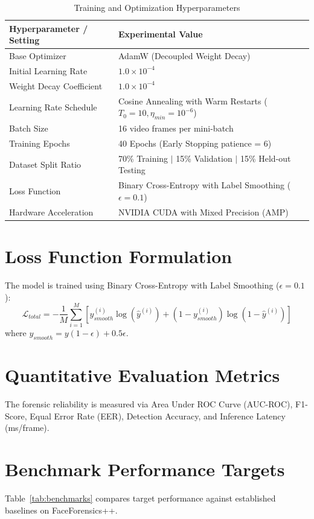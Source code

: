 \documentclass[12pt,a4paper]{report}
\begin{document}
\begin{table}[htbp]
\centering
\small
\caption{Training and Optimization Hyperparameters}
\label{tab:train_config}
\begin{tabular}{p{6.5cm} p{7.5cm}}
\toprule
\textbf{Hyperparameter / Setting} & \textbf{Experimental Value} \\
\midrule
Base Optimizer & AdamW (Decoupled Weight Decay) \\
Initial Learning Rate & $1.0 \times 10^{-4}$ \\
Weight Decay Coefficient & $1.0 \times 10^{-4}$ \\
Learning Rate Schedule & Cosine Annealing with Warm Restarts ($T_0=10, \eta_{min}=10^{-6}$) \\
Batch Size & 16 video frames per mini-batch \\
Training Epochs & 40 Epochs (Early Stopping patience = 6) \\
Dataset Split Ratio & 70\% Training $\mid$ 15\% Validation $\mid$ 15\% Held-out Testing \\
Loss Function & Binary Cross-Entropy with Label Smoothing ($\epsilon = 0.1$) \\
Hardware Acceleration & NVIDIA CUDA with Mixed Precision (AMP) \\
\bottomrule
\end{tabular}
\end{table}

\section{Loss Function Formulation}
The model is trained using Binary Cross-Entropy with Label Smoothing ($\epsilon = 0.1$):
\begin{equation}
\mathcal{L}_{total} = - \frac{1}{M} \sum_{i=1}^{M} \left[ y_{smooth}^{(i)} \log\left(\hat{y}^{(i)}\right) + (1 - y_{smooth}^{(i)}) \log\left(1 - \hat{y}^{(i)}\right) \right]
\end{equation}
where $y_{smooth} = y(1 - \epsilon) + 0.5\epsilon$.

\section{Quantitative Evaluation Metrics}
The forensic reliability is measured via Area Under ROC Curve (AUC-ROC), F1-Score, Equal Error Rate (EER), Detection Accuracy, and Inference Latency (ms/frame).

\section{Benchmark Performance Targets}
Table~\ref{tab:benchmarks} compares target performance against established baselines on FaceForensics++.
\end{document}
